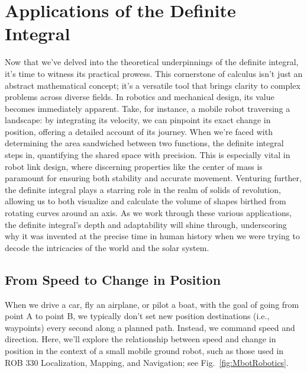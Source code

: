 \section{Applications of the Definite Integral}
\label{sec:ApplicationsDefiniteIntegral}

Now that we've delved into the theoretical underpinnings of the definite integral, it's time to witness its practical prowess. This cornerstone of calculus isn't just an abstract mathematical concept; it's a versatile tool that brings clarity to complex problems across diverse fields. In robotics and mechanical design, its value becomes immediately apparent. Take, for instance, a mobile robot traversing a landscape: by integrating its velocity, we can pinpoint its exact change in position, offering a detailed account of its journey. When we're faced with determining the area sandwiched between two functions, the definite integral steps in, quantifying the shared space with precision. This is especially vital in robot link design, where discerning properties like the center of mass is paramount for ensuring both stability and accurate movement. Venturing further, the definite integral plays a starring role in the realm of solids of revolution, allowing us to both visualize and calculate the volume of shapes birthed from rotating curves around an axis. As we work through these various applications, the definite integral's depth and adaptability will shine through, underscoring why it was invented at the precise time in human history when we were trying to decode the intricacies of the world and the solar system.

\subsection{From Speed to Change in Position}  
\label{sec:Speed2ChangePosition}

When we drive a car, fly an airplane, or pilot a boat, with the goal of going from point A to point B, we typically don't set new position destinations (i.e., waypoints) every second along a planned path. Instead, we command speed and direction. Here, we'll explore the relationship between speed and change in position in the context of a small mobile ground robot, such as those used in ROB 330 Localization, Mapping, and Navigation; see Fig.~\ref{fig:MbotRobotics}.


